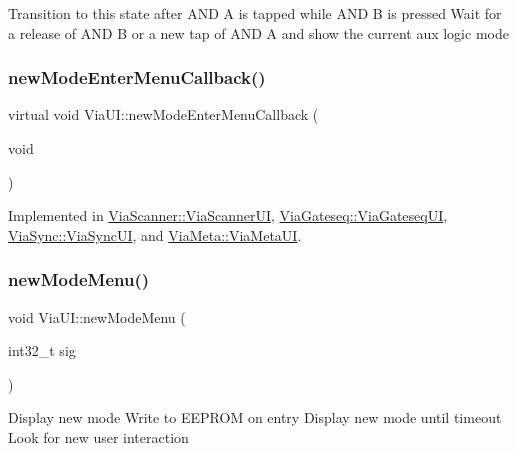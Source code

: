 Transition to this state after A\+ND A is tapped while A\+ND B is pressed Wait for a release of A\+ND B or a new tap of A\+ND A and show the current aux logic mode \mbox{\label{class_via_u_i_a2ebd72eaa0d26437d2c6320eb5fdf3e4}} 
\subsubsection{\texorpdfstring{new\+Mode\+Enter\+Menu\+Callback()}{newModeEnterMenuCallback()}}
{\footnotesize\ttfamily virtual void Via\+U\+I\+::new\+Mode\+Enter\+Menu\+Callback (\begin{DoxyParamCaption}\item[{void}]{ }\end{DoxyParamCaption})\hspace{0.3cm}{\ttfamily [pure virtual]}}



Implemented in \mbox{\hyperlink{class_via_scanner_1_1_via_scanner_u_i_a15124d20f2684fd9c5d1c83d41a15e5a}{Via\+Scanner\+::\+Via\+Scanner\+UI}}, \mbox{\hyperlink{class_via_gateseq_1_1_via_gateseq_u_i_a7ced8ac998979d31b1f0a617edba8490}{Via\+Gateseq\+::\+Via\+Gateseq\+UI}}, \mbox{\hyperlink{class_via_sync_1_1_via_sync_u_i_a553b539840029324ea43feb128f4b2c9}{Via\+Sync\+::\+Via\+Sync\+UI}}, and \mbox{\hyperlink{class_via_meta_1_1_via_meta_u_i_a6adf1a02d1e513a13727982347ecbe72}{Via\+Meta\+::\+Via\+Meta\+UI}}.

\mbox{\label{class_via_u_i_ac0e9dd4f7b102c712e14d9ee062dcaf7}} 
\subsubsection{\texorpdfstring{new\+Mode\+Menu()}{newModeMenu()}}
{\footnotesize\ttfamily void Via\+U\+I\+::new\+Mode\+Menu (\begin{DoxyParamCaption}\item[{int32\+\_\+t}]{sig }\end{DoxyParamCaption})}

Display new mode Write to E\+E\+P\+R\+OM on entry Display new mode until timeout Look for new user interaction \mbox{\label{class_via_u_i_a3ead361fc18c9079dcd97b9f34124898}} 
